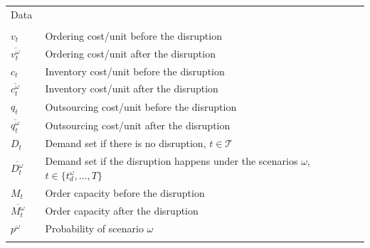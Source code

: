 \documentclass[11pt]{article}
\newcommand{\ms}{\medskip}
\begin{document}
\begin{table}[H]
\begin{tabular}{ l l l l }
				\multicolumn{4}{l}{Data} \\
				\\
				\(v_t\) & \qquad & Ordering cost/unit before the disruption & \ms\\
				\(\overline{v_t^\omega}\) & \qquad & Ordering cost/unit after the disruption  & \ms\\ 
				\(c_t\) & \qquad & Inventory cost/unit	before the disruption & \ms\\
				\(\overline{c_t^\omega}\) & \qquad & Inventory cost/unit after the disruption & \ms\\
				\(q_t\) & \qquad & Outsourcing cost/unit before the disruption & \ms\\
				\(\overline{q_t^\omega}\) & \qquad & Outsourcing cost/unit after the disruption & \ms\\ 
				\(D_t\) & \qquad & Demand set if there is no disruption, \(t \in \mathscr{T}\) & \ms\\
				\(\overline{D_t^\omega}\) & \qquad & Demand set if the disruption happens under the scenarios \(\omega\), \(t \in \{t_d^\omega, \dots, T \}\) & \ms\\ 
				\(M_t\)	& \qquad & Order capacity before the disruption & \ms\\
				\(\overline{M_t^\omega}\) & \qquad & Order capacity after the disruption & \ms\\
				\(p^\omega\) & \qquad & Probability of scenario \(\omega\) &\\
				\\
				

\end{tabular}
\end{table}
\end{document}
